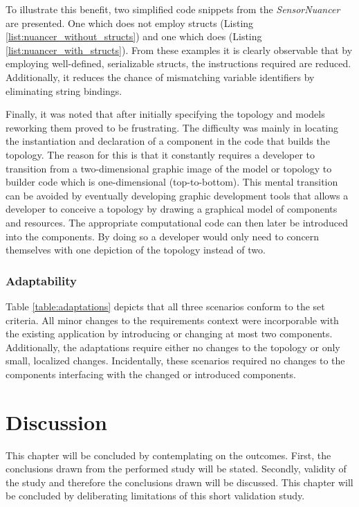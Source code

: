 To illustrate this benefit, two simplified code snippets from the \emph{SensorNuancer} are presented. One which does not employ structs (Listing \ref{list:nuancer_without_structs}) and one which does (Listing \ref{list:nuancer_with_structs}). From these examples it is clearly observable that by employing well-defined, serializable structs, the instructions required are reduced. Additionally, it reduces the chance of mismatching variable identifiers by eliminating string bindings.



Finally, it was noted that after initially specifying the topology and models reworking them proved to be frustrating. The difficulty was mainly in locating the instantiation and declaration of a component in the code that builds the topology. The reason for this is that it constantly requires a developer to transition from a two-dimensional graphic image of the model or topology to builder code which is one-dimensional (top-to-bottom). This mental transition can be avoided by eventually developing  graphic development tools that allows a developer to conceive a topology by drawing a graphical model of components and resources. The appropriate computational code can then later be introduced into the components. By doing so a developer would only need to concern themselves with one depiction of the topology instead of two.

\subsubsection{Adaptability}
Table \ref{table:adaptations} depicts that all three scenarios conform to the set criteria. All minor changes to the requirements context were incorporable with the existing application by introducing or changing at most two components. Additionally, the adaptations require either no changes to the topology or only small, localized changes. Incidentally, these scenarios required no changes to the components interfacing with the changed or introduced components.

\section{Discussion}
This chapter will be concluded by contemplating on the outcomes. First, the conclusions drawn from the performed study will be stated. Secondly, validity of the study and therefore the conclusions drawn will be discussed. This chapter will be concluded by deliberating limitations of this short validation study.
